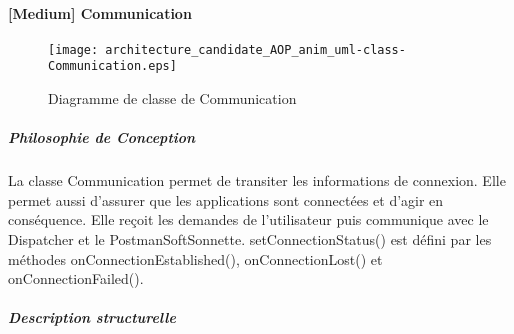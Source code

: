     \paragraph{[Medium] Communication}

        \begin{figure} [H]
            \centering
            \texttt{[image: architecture\_candidate\_AOP\_anim\_uml-class-Communication.eps]}
            \caption{Diagramme de classe de Communication}
            \label{Classe-Communication}
        \end{figure}
    
            \subparagraph{Philosophie de Conception}%
                
            La classe Communication permet de transiter les informations de connexion.
            Elle permet aussi d’assurer que les applications sont connectées et d’agir en conséquence. 
            Elle reçoit les demandes de l'utilisateur puis communique avec le Dispatcher et le PostmanSoftSonnette. 
            setConnectionStatus() est défini par les méthodes onConnectionEstablished(), onConnectionLost() et onConnectionFailed().
            \subparagraph{Description structurelle}%
                
